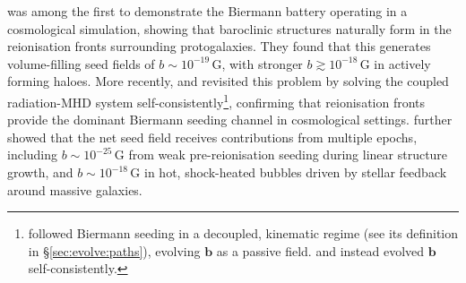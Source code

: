 \documentclass[12pt,twoside]{extreport}
\newcommand{\mVector}[1]{\bm{#1}} %
\begin{document}
\citet{gnedin2000generation} was among the first to demonstrate the Biermann battery operating in a cosmological simulation, showing that baroclinic structures naturally form in the reionisation fronts surrounding protogalaxies. They found that this generates volume-filling seed fields of $b \sim 10^{-19} \,\mathrm{G}$, with stronger $b \gtrsim 10^{-18} \,\mathrm{G}$ in actively forming haloes. More recently, \citet{attia2021cosmological} and \citet{garaldi2021magnetogenesis} revisited this problem by solving the coupled radiation-MHD system self-consistently\footnote{
    \citet{gnedin2000generation} followed Biermann seeding in a decoupled, kinematic regime (see its definition in \S\ref{sec:evolve:paths}), evolving $\mVector{b}$ as a passive field. \citet{attia2021cosmological} and \citet{garaldi2021magnetogenesis} instead evolved $\mVector{b}$ self-consistently.
}, confirming that reionisation fronts provide the dominant Biermann seeding channel in cosmological settings. \citet{attia2021cosmological} further showed that the net seed field receives contributions from multiple epochs, including $b \sim 10^{-25} \,\mathrm{G}$ from weak pre-reionisation seeding during linear structure growth, and $b \sim 10^{-18} \,\mathrm{G}$ in hot, shock-heated bubbles driven by stellar feedback around massive galaxies.
\end{document}
